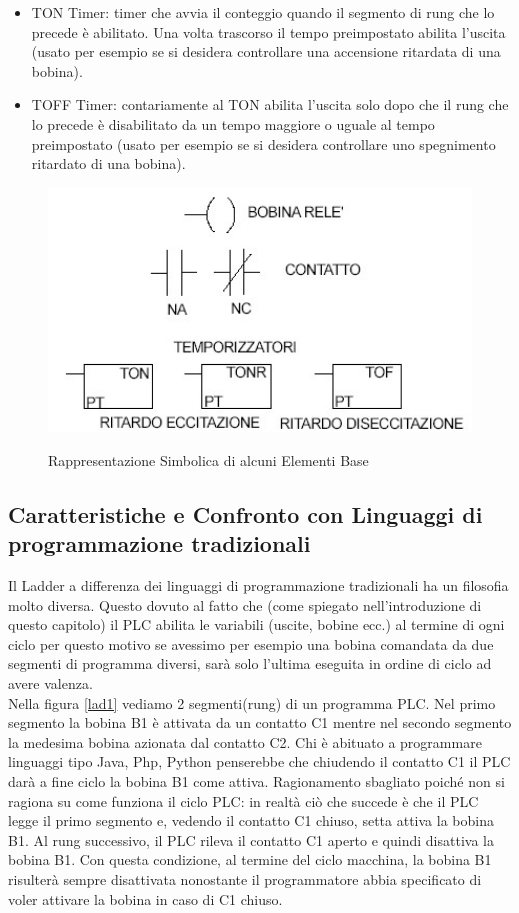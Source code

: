 \documentclass[12pt, a4paper, oneside]{book}
\begin{document}
\begin{itemize}
	\item TON Timer: timer che avvia il conteggio quando il segmento di rung che lo precede è abilitato. Una volta trascorso il tempo preimpostato abilita l'uscita (usato per esempio se si desidera controllare una accensione ritardata di una bobina).
	
	\item TOFF Timer: contariamente al TON abilita l'uscita solo dopo che il rung che lo precede è disabilitato da un tempo maggiore o uguale al tempo preimpostato (usato per esempio se si desidera controllare uno spegnimento ritardato di una bobina).
	
	
\end{itemize}

	\begin{figure}[H]
	\centering
	\includegraphics[width=12cm]{Immagini/LADELE}
	\label{L}
	\caption{Rappresentazione Simbolica di alcuni Elementi Base}
\end{figure}


\subsection{Caratteristiche e Confronto con Linguaggi di programmazione tradizionali}
	Il Ladder a differenza dei linguaggi di programmazione tradizionali ha un filosofia molto diversa. Questo dovuto al fatto che (come spiegato nell'introduzione di questo capitolo) il PLC abilita le variabili (uscite, bobine ecc.) al termine di ogni ciclo per questo motivo se avessimo per esempio una bobina comandata da due segmenti di programma diversi, sarà solo l'ultima eseguita in ordine di ciclo ad avere valenza.
	\\Nella figura \ref{lad1} vediamo 2 segmenti(rung) di un programma PLC. Nel primo segmento la bobina B1 è attivata da un contatto C1 mentre nel secondo segmento la medesima bobina azionata dal contatto C2. Chi è abituato a programmare linguaggi tipo Java, Php, Python penserebbe che chiudendo il contatto C1 il PLC darà a fine ciclo la bobina B1 come attiva. Ragionamento sbagliato poiché non si ragiona su come funziona il ciclo PLC: in realtà ciò che succede è che il PLC legge il primo segmento e, vedendo il contatto C1 chiuso, setta attiva la bobina B1. Al rung successivo, il PLC rileva il contatto C1 aperto e quindi disattiva la bobina B1. Con questa condizione, al termine del ciclo macchina, la bobina B1 risulterà sempre disattivata nonostante il programmatore abbia specificato di voler attivare la bobina in caso di C1 chiuso.
	
\end{document}
